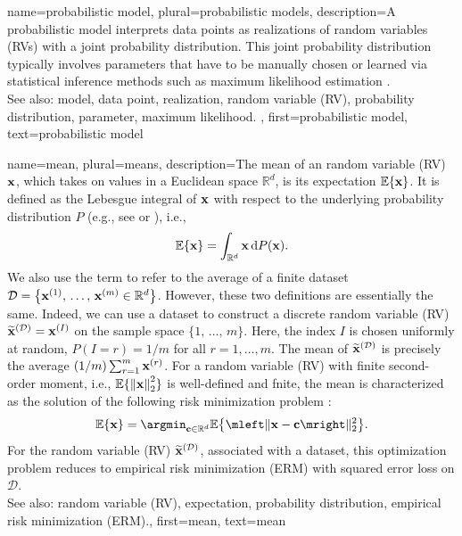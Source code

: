 {
{name={probabilistic model}, plural={probabilistic models},
	description={A probabilistic model interprets data points 
		as realizations of random variables (RVs) with a joint probability distribution. This joint probability distribution typically 
		involves parameters that have to be manually chosen or learned via statistical inference 
		methods such as maximum likelihood estimation \cite{LC}.
					\\ 
		See also: model, data point, realization, random variable (RV), probability distribution, parameter, maximum likelihood. }, 
	first={probabilistic model}, 
	text={probabilistic model} 
}


{name={mean}, plural={means},
	description={The  mean of an random variable (RV) ${\bf x}$, which takes 
 		on values in a Euclidean space $\mathbb{R}^{d}$, is its 
 		expectation $\mathbb{E} \{{\bf x}\}$. It is defined as the Lebesgue 
 		integral of ${\bf x}$ with respect to the underlying probability distribution $P$ (e.g., 
		see \cite{RudinBookPrinciplesMatheAnalysis} or \cite{BillingsleyProbMeasure}), i.e.,
		\[
			\mathbb{E} \{{\bf x}\} = \int_{\mathbb{R}^{d}} {\bf x} \, \mathrm{d}P({\bf x}).
		\]  
		We also use the term to refer to the average of a finite dataset
		$\mathcal{D} = \left\{ {\bf x}^{(1)}, \,\ldots, \,{\bf x}^{(m)} \in \mathbb{R}^{d}\right\}$. 
		However, these two definitions are essentially the same. Indeed, we can use 
		a dataset to construct a discrete random variable (RV) $\widetilde{{\bf x}}^{(\mathcal{D})}={\bf x}^{(I)}$ on 
		the sample space $\{1, \,\ldots, \,m\}$. Here, the index $I$ is 
		chosen uniformly at random, $P\left(I=r\right)=1/m$ for all 
		$r=1,\ldots,m$. The mean of $\widetilde{{\bf x}}^{(\mathcal{D})}$ is 
		precisely the average $({1}/{m}) \sum_{r=1}^{m} {\bf x}^{(r)}$.
		For a random variable (RV) with finite second-order moment, i.e., 
		$\mathbb{E} \{ \mleft\lVert {\bf x} \mright\rVert_{2}^{2} \}$ is well-defined and fnite, 
		the mean is characterized as the solution of the 
		following risk minimization problem \cite{BertsekasProb}:
		\[
			\mathbb{E} \{{\bf x}\} = \argmin_{{\bf c} \in \mathbb{R}^{d}} 
			\mathbb{E}  \big\{\mleft\lVert {\bf x} - {\bf c} \mright\rVert_{2}^{2}\big \}.
		\]
		For the random variable (RV) $\widetilde{{\bf x}}^{(\mathcal{D})}$, associated with a dataset, 
		this optimization problem reduces to empirical risk minimization (ERM) with squared error loss on $\mathcal{D}$. 
		\\ 
		See also: random variable (RV), expectation, probability distribution, empirical risk minimization (ERM).}, 
	first={mean}, 
	text={mean} 
}

}
